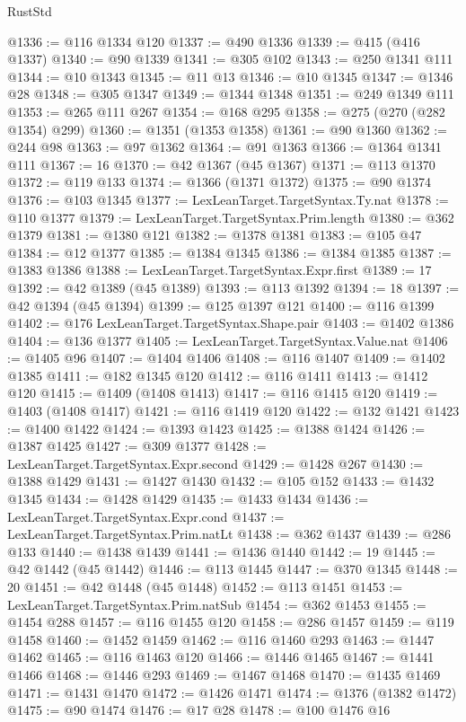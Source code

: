 \begin{lexlean}{RustStd}
\begin{coremodule}
@1336 := @116 @1334 @120
@1337 := @490 @1336
@1339 := @415 (@416 @1337)
@1340 := @90 @1339
@1341 := @305 @102
@1343 := @250 @1341 @111
@1344 := @10 @1343
@1345 := @11 @13
@1346 := @10 @1345
@1347 := @1346 @28
@1348 := @305 @1347
@1349 := @1344 @1348
@1351 := @249 @1349 @111
@1353 := @265 @111 @267
@1354 := @168 @295
@1358 := @275 (@270 (@282 @1354) @299)
@1360 := @1351 (@1353 @1358)
@1361 := @90 @1360
@1362 := @244 @98
@1363 := @97 @1362
@1364 := @91 @1363
@1366 := @1364 @1341 @111
@1367 := 16
@1370 := @42 @1367 (@45 @1367)
@1371 := @113 @1370
@1372 := @119 @133
@1374 := @1366 (@1371 @1372)
@1375 := @90 @1374
@1376 := @103 @1345
@1377 := LexLeanTarget.TargetSyntax.Ty.nat
@1378 := @110 @1377
@1379 := LexLeanTarget.TargetSyntax.Prim.length
@1380 := @362 @1379
@1381 := @1380 @121
@1382 := @1378 @1381
@1383 := @105 @47
@1384 := @12 @1377
@1385 := @1384 @1345
@1386 := @1384 @1385
@1387 := @1383 @1386
@1388 := LexLeanTarget.TargetSyntax.Expr.first
@1389 := 17
@1392 := @42 @1389 (@45 @1389)
@1393 := @113 @1392
@1394 := 18
@1397 := @42 @1394 (@45 @1394)
@1399 := @125 @1397 @121
@1400 := @116 @1399
@1402 := @176 LexLeanTarget.TargetSyntax.Shape.pair
@1403 := @1402 @1386
@1404 := @136 @1377
@1405 := LexLeanTarget.TargetSyntax.Value.nat
@1406 := @1405 @96
@1407 := @1404 @1406
@1408 := @116 @1407
@1409 := @1402 @1385
@1411 := @182 @1345 @120
@1412 := @116 @1411
@1413 := @1412 @120
@1415 := @1409 (@1408 @1413)
@1417 := @116 @1415 @120
@1419 := @1403 (@1408 @1417)
@1421 := @116 @1419 @120
@1422 := @132 @1421
@1423 := @1400 @1422
@1424 := @1393 @1423
@1425 := @1388 @1424
@1426 := @1387 @1425
@1427 := @309 @1377
@1428 := LexLeanTarget.TargetSyntax.Expr.second
@1429 := @1428 @267
@1430 := @1388 @1429
@1431 := @1427 @1430
@1432 := @105 @152
@1433 := @1432 @1345
@1434 := @1428 @1429
@1435 := @1433 @1434
@1436 := LexLeanTarget.TargetSyntax.Expr.cond
@1437 := LexLeanTarget.TargetSyntax.Prim.natLt
@1438 := @362 @1437
@1439 := @286 @133
@1440 := @1438 @1439
@1441 := @1436 @1440
@1442 := 19
@1445 := @42 @1442 (@45 @1442)
@1446 := @113 @1445
@1447 := @370 @1345
@1448 := 20
@1451 := @42 @1448 (@45 @1448)
@1452 := @113 @1451
@1453 := LexLeanTarget.TargetSyntax.Prim.natSub
@1454 := @362 @1453
@1455 := @1454 @288
@1457 := @116 @1455 @120
@1458 := @286 @1457
@1459 := @119 @1458
@1460 := @1452 @1459
@1462 := @116 @1460 @293
@1463 := @1447 @1462
@1465 := @116 @1463 @120
@1466 := @1446 @1465
@1467 := @1441 @1466
@1468 := @1446 @293
@1469 := @1467 @1468
@1470 := @1435 @1469
@1471 := @1431 @1470
@1472 := @1426 @1471
@1474 := @1376 (@1382 @1472)
@1475 := @90 @1474
@1476 := @17 @28
@1478 := @100 @1476 @16

\end{coremodule}
\end{lexlean}
